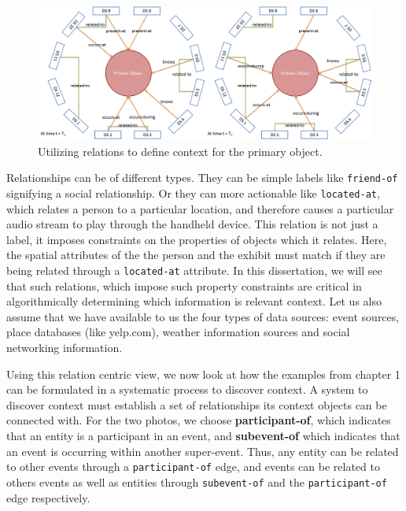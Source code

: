 \begin{figure}[t]
\centering
\includegraphics[width=\textwidth]{media/chapter2/cn.png}
\caption{Utilizing relations to define context for the primary object.}
\label{fig:cn-def}
\end{figure}

Relationships can be of different types. They can be simple labels like \texttt{friend-of} signifying a social relationship. Or they can more actionable like \texttt{located-at}, which relates a person to a particular location, and therefore causes a particular audio stream to play through the handheld device. This relation is not just a label, it imposes constraints on the properties of objects which it relates. Here, the spatial attributes of the the person and the exhibit must match if they are being related through a \texttt{located-at} attribute. In this dissertation, we will see that such relations, which impose such property constraints are critical in algorithmically determining which information is relevant context. Let us also assume that we have available to us the four types of data sources: event sources, place databases (like yelp.com), weather information sources and social networking information.

Using this relation centric view, we now look at how the examples from chapter 1 can be formulated in a systematic process to discover context. A system to discover context must establish a set of relationships its context objects can be connected with. For the two photos, we choose \textbf{participant-of}, which indicates that an entity is a participant in an event, and \textbf{subevent-of} which indicates that an event is occurring within another super-event. Thus, any entity can be related to other events through a \texttt{participant-of} edge, and events can be related to others events as well as entities through \texttt{subevent-of} and the \texttt{participant-of} edge respectively.

